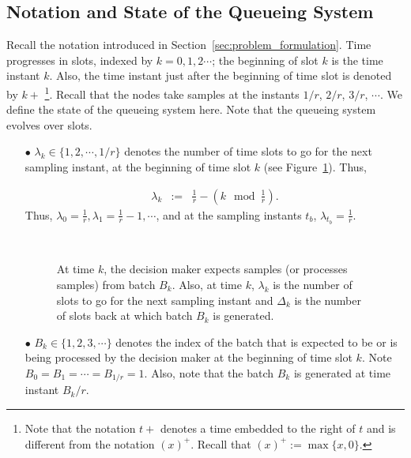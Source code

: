 \documentclass[acmtosn]{acmtrans2m}
\begin{document}
\subsection{Notation and State of the Queueing System}
\label{subsec:notation}
Recall the notation introduced in Section~\ref{sec:problem_formulation}.
Time progresses in slots, indexed by $k=0,1,2\cdots$; the beginning 
of slot $k$ is the time instant $k$. Also, the time instant 
just after the beginning of time slot is denoted by $k+$ 
\footnote{Note that the notation $t+$ denotes a time embedded to the
right of $t$ and is different from the notation $(x)^+$.
Recall that $(x)^+ := \max\{x,0\}$.}. 
Recall that the nodes take samples at the instants 
$1/r$, $2/r$, $3/r$, $\cdots$. We define the state of the queueing system here. Note that the queueing system evolves over slots.
\begin{itemize}
\item[$\bullet$] $\lambda_k \in \{1,2,\cdots, 1/r\}$ denotes the number 
      of time slots to go for the next sampling instant, at the beginning
      of time slot $k$ (see Figure~\ref{fig:lambda-delta}). Thus,

      \begin{eqnarray}
      \label{eqn:lambda-defn}
      \lambda_k & := & \frac{1}{r} - \left(k\mod\frac{1}{r}\right). 
      \end{eqnarray}
      Thus, $\lambda_0 = \frac{1}{r}, \lambda_1 = \frac{1}{r}-1,
      \cdots$, and at the sampling instants $t_b$, $\lambda_{t_b} = \frac{1}{r}$.

 \begin{figure}[t]
   \centering \
   \caption{At time $k$, the decision maker expects samples (or processes
   samples) from batch $B_k$. Also, at time $k$, $\lambda_k$ is the 
   number of slots to go for the next sampling instant and
   $\Delta_k$ is the number of slots back at which batch $B_k$ is generated.}
\label{fig:lambda-delta}
 \end{figure}

\item[$\bullet$] $B_k \in \{1,2,3,\cdots\}$ denotes the index of the 
      batch that is expected to be or is being processed by the decision maker 
      at the beginning of time slot $k$. Note $B_0 = B_1 = \cdots = 
      B_{1/r} = 1$. Also, note that the batch $B_k$ is generated at 
      time instant $B_k/r$. 


\end{itemize}
\end{document}
